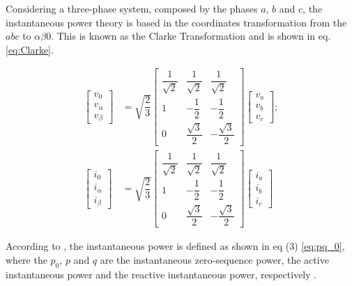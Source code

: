 Considering a three-phase system, composed by the phases $a$, $b$ and $c$, the instantaneous power theory is based in the coordinates transformation from the $abc$ to $\alpha \beta 0 $. This is known as the Clarke Transformation and is shown in eq. \ref{eq:Clarke}.


\begin{equation}
\begin{aligned}
\begin{bmatrix}
v_0\\
v_\alpha\\
v_\beta
\end{bmatrix}
& = \sqrt{\dfrac{2}{3}}
\begin{bmatrix}
\dfrac{1}{\sqrt{2}}	& \dfrac{1}{\sqrt{2}}	& \dfrac{1}{\sqrt{2}}		\\[2ex]
1					& -\dfrac{1}{2}			& -\dfrac{1}{2}				\\[2ex]
0					& \dfrac{\sqrt{3}}{2}	& -\dfrac{\sqrt{3}}{2}
\end{bmatrix}
\begin{bmatrix}
v_a\\
v_b\\
v_c
\end{bmatrix}
;\\
\begin{bmatrix}
i_0\\
i_\alpha\\
i_\beta
\end{bmatrix}
& = \sqrt{\dfrac{2}{3}}
\begin{bmatrix}
\dfrac{1}{\sqrt{2}}	& \dfrac{1}{\sqrt{2}}	& \dfrac{1}{\sqrt{2}}		\\[2ex]
1					& -\dfrac{1}{2}			& -\dfrac{1}{2}				\\[2ex]
0					& \dfrac{\sqrt{3}}{2}	& -\dfrac{\sqrt{3}}{2}
\end{bmatrix}
\begin{bmatrix}
i_a\\
i_b\\
i_c
\end{bmatrix}
\label{eq:Clarke}
\end{aligned}
\end{equation} 

According to \cite{Akagi2007}, the instantaneous power is defined as shown in eq (3) \ref{eq:pq_0}, where the $p_0$, $p$ and $q$ are the instantaneous zero-sequence power, the active instantaneous power and the reactive instantaneous power, respectively \cite{Akagi2007,Peng1996}.

